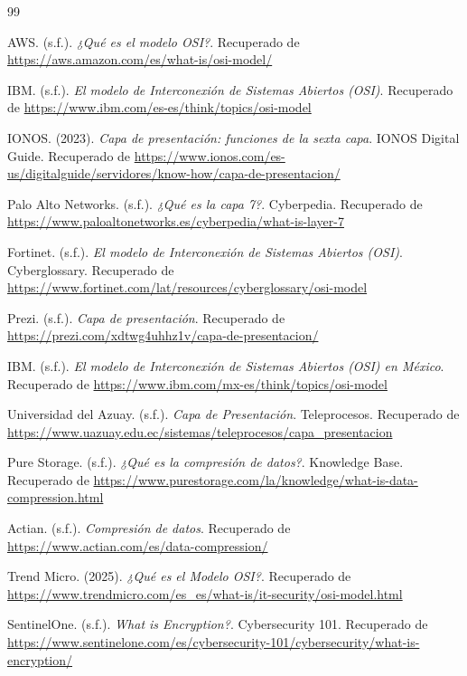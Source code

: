 \documentclass[a4paper,12pt]{article}
\begin{document}
\begin{thebibliography}{99}

AWS. (s.f.). \textit{¿Qué es el modelo OSI?}. Recuperado de \url{https://aws.amazon.com/es/what-is/osi-model/}

IBM. (s.f.). \textit{El modelo de Interconexión de Sistemas Abiertos (OSI)}. Recuperado de \url{https://www.ibm.com/es-es/think/topics/osi-model}

IONOS. (2023). \textit{Capa de presentación: funciones de la sexta capa}. IONOS Digital Guide. Recuperado de \url{https://www.ionos.com/es-us/digitalguide/servidores/know-how/capa-de-presentacion/}

Palo Alto Networks. (s.f.). \textit{¿Qué es la capa 7?}. Cyberpedia. Recuperado de \url{https://www.paloaltonetworks.es/cyberpedia/what-is-layer-7}

Fortinet. (s.f.). \textit{El modelo de Interconexión de Sistemas Abiertos (OSI)}. Cyberglossary. Recuperado de \url{https://www.fortinet.com/lat/resources/cyberglossary/osi-model}

Prezi. (s.f.). \textit{Capa de presentación}. Recuperado de \url{https://prezi.com/xdtwg4uhhz1v/capa-de-presentacion/}

IBM. (s.f.). \textit{El modelo de Interconexión de Sistemas Abiertos (OSI) en México}. Recuperado de \url{https://www.ibm.com/mx-es/think/topics/osi-model}

Universidad del Azuay. (s.f.). \textit{Capa de Presentación}. Teleprocesos. Recuperado de \url{https://www.uazuay.edu.ec/sistemas/teleprocesos/capa_presentacion}

Pure Storage. (s.f.). \textit{¿Qué es la compresión de datos?}. Knowledge Base. Recuperado de \url{https://www.purestorage.com/la/knowledge/what-is-data-compression.html}

Actian. (s.f.). \textit{Compresión de datos}. Recuperado de \url{https://www.actian.com/es/data-compression/}

Trend Micro. (2025). \textit{¿Qué es el Modelo OSI?}. Recuperado de \url{https://www.trendmicro.com/es_es/what-is/it-security/osi-model.html}

SentinelOne. (s.f.). \textit{What is Encryption?}. Cybersecurity 101. Recuperado de \url{https://www.sentinelone.com/es/cybersecurity-101/cybersecurity/what-is-encryption/}


\end{thebibliography}
\end{document}

